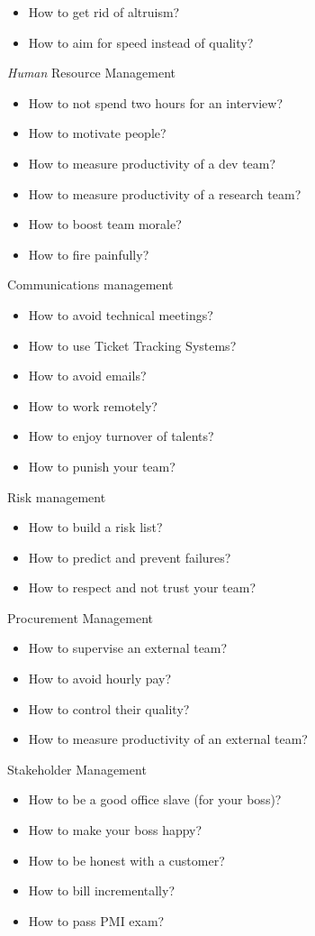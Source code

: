 \documentclass[nobrand,anonymous,nodate,nosecurity]{huawei}
\begin{document}
\begin{lectures}
\begin{itemize}
    \item How to get rid of altruism?
    \item How to aim for speed instead of quality?
    \end{itemize}
\item \emph{Human} Resource Management
    \begin{itemize}
    \item How to not spend two hours for an interview?
    \item How to motivate people?
    \item How to measure productivity of a dev team?
    \item How to measure productivity of a research team?
    \item How to boost team morale?
    \item How to fire painfully?
    \end{itemize}
\item Communications management
    \begin{itemize}
    \item How to avoid technical meetings?
    \item How to use Ticket Tracking Systems?
    \item How to avoid emails?
    \item How to work remotely?
    \item How to enjoy turnover of talents?
    \item How to punish your team?
    \end{itemize}
\item Risk management
    \begin{itemize}
    \item How to build a risk list?
    \item How to predict and prevent failures?
    \item How to respect and not trust your team?
    \end{itemize}
\item Procurement Management
    \begin{itemize}
    \item How to supervise an external team?
    \item How to avoid hourly pay?
    \item How to control their quality?
    \item How to measure productivity of an external team?
    \end{itemize}
\item Stakeholder Management
    \begin{itemize}
    \item How to be a good office slave (for your boss)?
    \item How to make your boss happy?
    \item How to be honest with a customer?
    \item How to bill incrementally?
    \item How to pass PMI exam?
    \end{itemize}
\end{lectures}
\end{document}
